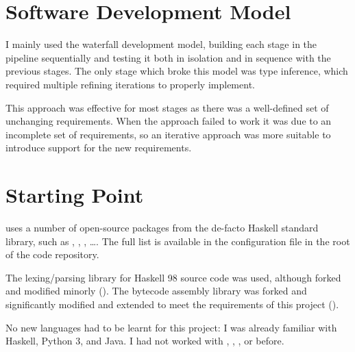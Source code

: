 \documentclass[dissertation.tex]{subfiles}
\begin{document}
\section{Software Development Model}\label{sec:software-development-model}
{
    I mainly used the waterfall development model, building each stage in the pipeline sequentially and testing it both in isolation and in sequence with the previous stages. The only stage which broke this model was type inference, which required multiple refining iterations to properly implement.

    This approach was effective for most stages as there was a well-defined set of unchanging requirements. When the approach failed to work it was due to an incomplete set of requirements, so an iterative approach was more suitable to introduce support for the new requirements.
}
\section{Starting Point}\label{sec:starting-point}
{
    \compilername uses a number of open-source packages from the de-facto Haskell standard library, such as , , , \dots. The full list is available in the  configuration file in the root of the code repository.

    The  lexing/parsing library for Haskell 98 source code was used, although forked and modified minorly (). The bytecode assembly library  was forked and significantly modified and extended to meet the requirements of this project ().

    No new languages had to be learnt for this project: I was already familiar with Haskell, Python 3, and Java. I had not worked with , , , or  before. 
}
\end{document}
